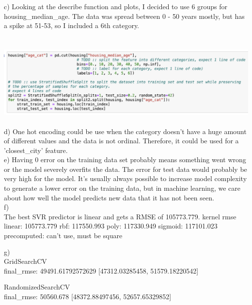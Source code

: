 \documentclass[11pt]{article}
\begin{document}
c)  Looking at the describe function and plots, I decided to use 6 groups for housing\_median\_age. The data was spread between 0 - 50 years mostly, but has a spike at 51-53, so I included a 6th category. \\
\\
\\
\includegraphics[scale=0.35]{pic2}
\\
\\
d) One hot encoding could be use when the category doesn't have a huge amount of different values and the data is not ordinal. Therefore, it could be used for a 'closest\_city' feature.\\

e) Having 0 error on the training data set probably means something went wrong or the model severely overfits the data. The error for test data would probably be very high for the model. It's usually always possible to increase model complexity to generate a lower error on the training data, but in machine learning, we care about how well the model predicts new data that it has not been seen.\\

f) \\
The best SVR predictor is linear and gets a RMSE of 105773.779.
kernel       rmse
linear: 105773.779
rbf: 117550.993
poly: 117330.949
sigmoid: 117101.023
precomputed: can't use, must be square

g) \\
GridSearchCV \\
final\_rmse: 49491.61792572629 
[47312.03285458, 51579.18220542] 

RandomizedSearchCV \\
final\_rmse: 50560.678 
[48372.88497456, 52657.65329852] 
\end{document}
